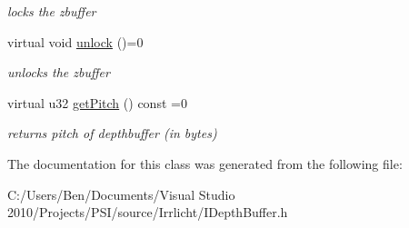 \begin{DoxyCompactItemize}
\begin{DoxyCompactList}\small\item\em locks the zbuffer \end{DoxyCompactList}\item 
\hypertarget{classirr_1_1video_1_1_i_stencil_buffer_ab2b137bbce05da94b7721d308a17ab5f}{virtual void \hyperlink{classirr_1_1video_1_1_i_stencil_buffer_ab2b137bbce05da94b7721d308a17ab5f}{unlock} ()=0}\label{classirr_1_1video_1_1_i_stencil_buffer_ab2b137bbce05da94b7721d308a17ab5f}

\begin{DoxyCompactList}\small\item\em unlocks the zbuffer \end{DoxyCompactList}\item 
\hypertarget{classirr_1_1video_1_1_i_stencil_buffer_a8f6c9d545dde4ff258adf4875af325ff}{virtual u32 \hyperlink{classirr_1_1video_1_1_i_stencil_buffer_a8f6c9d545dde4ff258adf4875af325ff}{get\-Pitch} () const =0}\label{classirr_1_1video_1_1_i_stencil_buffer_a8f6c9d545dde4ff258adf4875af325ff}

\begin{DoxyCompactList}\small\item\em returns pitch of depthbuffer (in bytes) \end{DoxyCompactList}\end{DoxyCompactItemize}


The documentation for this class was generated from the following file\-:\begin{DoxyCompactItemize}
\item 
C\-:/\-Users/\-Ben/\-Documents/\-Visual Studio 2010/\-Projects/\-P\-S\-I/source/\-Irrlicht/I\-Depth\-Buffer.\-h\end{DoxyCompactItemize}
